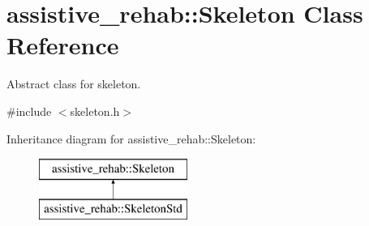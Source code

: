 \section{assistive\+\_\+rehab\+::Skeleton Class Reference}
\label{classassistive__rehab_1_1Skeleton}


Abstract class for skeleton.  




{\ttfamily \#include $<$skeleton.\+h$>$}

Inheritance diagram for assistive\+\_\+rehab\+::Skeleton\+:\begin{figure}[H]
\begin{center}
\leavevmode
\includegraphics[height=2.000000cm]{classassistive__rehab_1_1Skeleton}
\end{center}
\end{figure}
